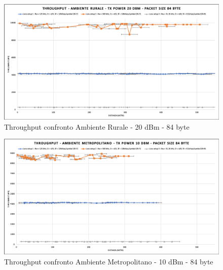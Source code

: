 \documentclass[12pt,a4paper,openright,twoside]{report}
\begin{document}
\begin{figure}[h]                      
\begin{center} 
\includegraphics[width=\textwidth]{THROUGHPUT_confronto_AR_20dBm_84byte.png}
\caption[Throughput confronto Ambiente Rurale - 20 dBm - 84 byte]{Throughput confronto Ambiente Rurale - 20 dBm - 84 byte}\label{fig:prima}
\end{center}
\end{figure}

\begin{figure}[h]                      
\begin{center} 
\includegraphics[width=\textwidth]{THROUGHPUT_confronto_AM_10dBm_84byte.png}
\caption[Throughput confronto Ambiente Metropolitano - 10 dBm - 84 byte]{Throughput confronto Ambiente Metropolitano - 10 dBm - 84 byte}\label{fig:prima}
\end{center}
\end{figure}
\end{document}
